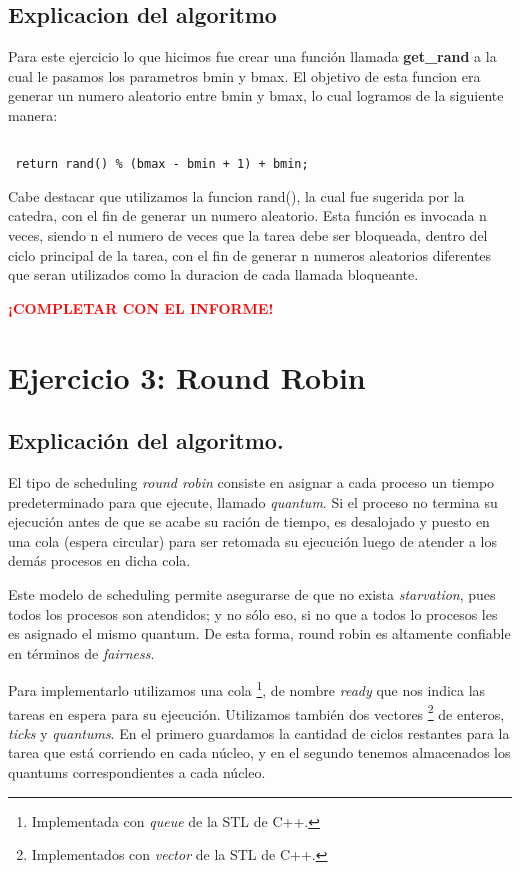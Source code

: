 \documentclass[a4paper]{article}
\begin{document}
 \subsection{Explicacion del algoritmo}
 Para este ejercicio lo que hicimos fue crear una funci\'on llamada
 \textbf{get\_rand} a la cual le pasamos los parametros bmin y bmax. El
 objetivo de esta funcion era generar un numero aleatorio entre bmin y bmax,
 lo cual logramos de la siguiente manera:
 \begin{verbatim}

 return rand() % (bmax - bmin + 1) + bmin;

 \end{verbatim}

 Cabe destacar que utilizamos la funcion rand(), la cual fue sugerida por la
 catedra, con el fin de generar un numero aleatorio.
 Esta funci\'on es invocada n veces, siendo n el numero de veces que la
 tarea debe ser bloqueada, dentro del ciclo principal de la tarea, con el
 fin de generar n numeros aleatorios diferentes que seran utilizados como la
 duracion de cada llamada bloqueante.




\textbf{\textcolor{red}{¡COMPLETAR CON EL INFORME!}}

\section{Ejercicio 3: Round Robin}

\subsection{Explicación del algoritmo.}
El tipo de scheduling \textit{round robin} consiste en asignar a cada proceso un
tiempo predeterminado para que ejecute, llamado \textit{quantum}. Si el proceso no termina su ejecución antes de que se
acabe su ración de tiempo, es desalojado y puesto en una cola (espera
circular) para ser retomada su ejecución luego de atender a los demás
procesos en dicha cola.

Este modelo de scheduling permite asegurarse de que no exista
\textit{starvation}, pues todos los procesos son atendidos; y no sólo eso,
si no que a todos lo procesos les es asignado el mismo quantum. De esta
forma, round robin es altamente confiable en términos de \textit{fairness}.

Para implementarlo utilizamos una cola \footnote{Implementada con
\textit{queue} de la STL de C++.}, de nombre
\textit{ready} que nos indica las tareas en espera para su ejecución.
Utilizamos también dos vectores \footnote{Implementados con
\textit{vector} de la STL de C++.} de enteros, \textit{ticks} y
\textit{quantums}. En el primero guardamos la cantidad de ciclos restantes
para la tarea que está corriendo en cada núcleo, y en el segundo tenemos
almacenados los quantums correspondientes a cada núcleo. 
\end{document}
